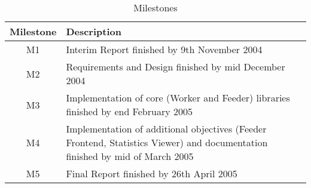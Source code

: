\begin{table}[H]
\begin{tabularx}{\linewidth}{cX}
\toprule
\textbf{Milestone} & \textbf{Description} \\
\midrule
\endhead
M1 & Interim Report finished by 9th November 2004 \\
M2 & Requirements and Design finished by mid December 2004 \\
M3 & Implementation of core (Worker and Feeder) libraries finished by end February 2005 \\
M4 & Implementation of additional objectives (Feeder Frontend, Statistics Viewer) and documentation finished by mid of March 2005 \\
M5 & Final Report finished by 26th April 2005 \\
\bottomrule
\end{tabularx}
\caption{Milestones}
\label{tab:fin_milestones}
\end{table}
